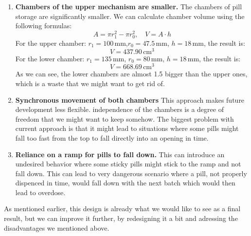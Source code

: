 \begin{enumerate}
\item \textbf{Chambers of the upper mechanism are smaller.} The chambers of pill storage are significantly smaller. We can calculate chamber volume using the following formulas:
\[
A = \pi r_1^2 - \pi r_0^2,\quad V = A \cdot h
\]
For the upper chamber: \( r_1 = 100\,\text{mm} \),\( r_0 = 47.5\,\text{mm} \), \( h = 18\,\text{mm} \), the result is:
\[
V = 437.90\,\text{cm}^3
\]
For the lower chamber:  \( r_1 = 135\,\text{mm} \), \( r_0 = 80\,\text{mm} \), \( h = 18\,\text{mm} \), the result is:
\[
V = 668.69\,\text{cm}^3
\]
As we can see, the lower chambers are almost 1.5 bigger than the upper ones, which is a waste that we might want to get rid of.
	\item{\textbf{Synchronous movement of both chambers}} This approach makes future development less flexible. independence of the chambers is a degree of freedom that we might want to keep somehow. The biggest problem with current approach is that it might lead to situations where some pills might fall too fast from the top to fall directly into an opening in time.
	\item{\textbf{Reliance on a ramp for pills to fall down.}} This can introduce an undesired behavior where some sticky pills might stick to the ramp and not fall down. This can lead to very dangerous scenario where a pill, not properly dispenced in time, would fall down with the next batch which would then lead to overdose.
\end{enumerate}

As mentioned earlier, this design is already what we would like to see as a final result, but we can improve it further, by redesigning it a bit and adressing the disadvantages we mentioned above.
\newpage

